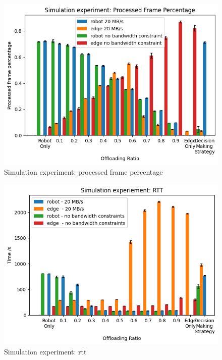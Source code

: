 \begin{figure}[htp]
    \centering
    \includegraphics[width=\linewidth]{figures/experiment/simulation/processed_frame_percentage.png}
    \caption{Simulation experiment: processed frame percentage}
    \label{fig:simulation:processed_frame_percentage}
\end{figure}

\begin{figure}[htp]
    \centering
    \includegraphics[width=\linewidth]{figures/experiment/simulation/rtt.png}
    \caption{Simulation experiment: \Gls{rtt}}
    \label{fig:simulation:rtt}
\end{figure}

